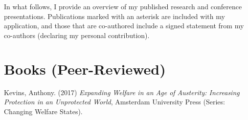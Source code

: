 \documentclass[letterpaper,fontsize=10pt]{scrartcl}
\newenvironment{modenumerate}
	  {\enumerate\setupmodenumerate}
	  {\endenumerate}
\newif\ifmoditem
\newcommand{\setupmodenumerate}{%
	  \global\moditemfalse
	  \let\origmakelabel\makelabel
	  \def\moditem##1{\global\moditemtrue\def\mesymbol{##1}\item}%
	  \def\makelabel##1{%
		\origmakelabel{##1\ifmoditem\rlap{\mesymbol}\fi\enspace}%
		\global\moditemfalse}%
	}
\begin{document}
	
	\sloppy

	In what follows, I provide an overview of my published research and conference presentations. Publications marked with an asterisk are included with my application, and those that are co-authored include a signed statement from my co-authors (declaring my personal contribution).   

	\vspace{-1em}
	\section{Books (Peer-Reviewed)}
	\vspace{-1.5em}
	\begin{modenumerate}
		\moditem{*}	Kevins, Anthony. (2017) \textit{Expanding Welfare in an Age of Austerity: Increasing Protection in an Unprotected World}, Amsterdam University Press (Series: Changing Welfare States).
	\end{modenumerate}
	
	\vspace{-1em}
\end{document}
